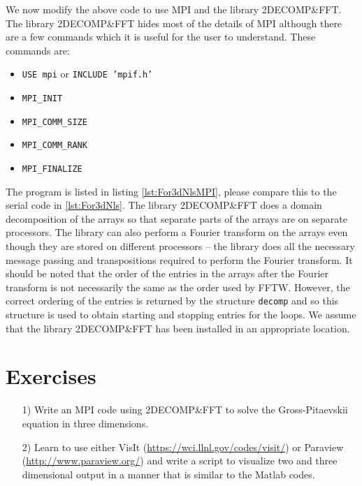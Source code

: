

We now modify the above code to use MPI and the library 2DECOMP{\&}FFT.  The library 2DECOMP{\&}FFT hides most of the details of MPI although there are a few commands which it is useful for the user to understand. These commands are:
\begin{itemize}
\item \texttt{USE mpi} or \texttt{INCLUDE 'mpif.h'} 
\item \texttt{MPI\_INIT}
\item \texttt{MPI\_COMM\_SIZE}
\item \texttt{MPI\_COMM\_RANK}
\item \texttt{MPI\_FINALIZE}
\end{itemize}

The program is listed in listing \ref{lst:For3dNlsMPI}, please compare this to the serial code in \ref{lst:For3dNls}. The library 2DECOMP{\&}FFT does a domain decomposition of the arrays so that separate parts of the arrays are on separate processors.  The library can also perform a Fourier transform on the arrays even though they are stored on different processors -- the library does all the necessary message passing and transpositions required to perform the Fourier transform. It should be noted that the order of the entries in the arrays after the Fourier transform is not necessarily the same as the order used by FFTW. However, the correct ordering of the entries is returned by the structure \texttt{decomp} and so this structure is used to obtain starting and stopping entries for the loops. We assume that the library 2DECOMP{\&}FFT has been installed in an appropriate location. 



\section{Exercises}

\begin{enumerate}
\item[1)] Write an MPI  code using 2DECOMP{\&}FFT to solve the Gross-Pitaevskii equation in three dimensions.
\item[2)] Learn to use either VisIt (\url{https://wci.llnl.gov/codes/visit/}) or Paraview (\url{http://www.paraview.org/}) and write a script to visualize two and three dimensional output in a manner that is similar to the Matlab codes.
\end{enumerate}

